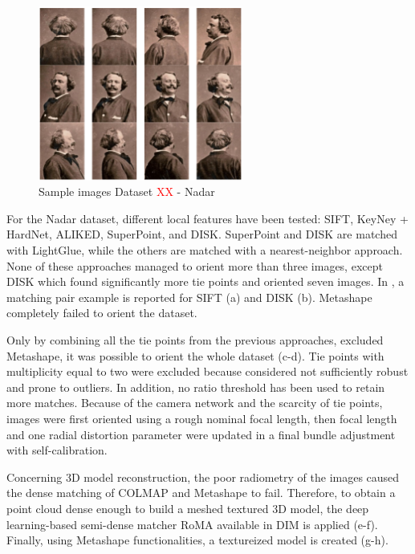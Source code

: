 \begin{figure}
    \centering
    \includegraphics[width=0.6\textwidth]{nadar_images}
    \caption{Sample images Dataset \textcolor{red}{XX} - Nadar}
    \label{fig:5:nadar_images}
\end{figure}

For the Nadar dataset, different local features have been tested: SIFT, KeyNey + HardNet, ALIKED, SuperPoint, and DISK.
SuperPoint and DISK are matched with LightGlue, while the others are matched with a nearest-neighbor approach. 
None of these approaches managed to orient more than three images, except DISK which found significantly more tie points and oriented seven images. 
In , a matching pair example is reported for SIFT (a) and DISK (b).
Metashape completely failed to orient the dataset. 

Only by combining all the tie points from the previous approaches, excluded Metashape, it was possible to orient the whole dataset (c-d). 
Tie points with multiplicity equal to two were excluded because considered not sufficiently robust and prone to outliers. 
In addition, no ratio threshold has been used to retain more matches. 
Because of the camera network and the scarcity of tie points, images were first oriented using a rough nominal focal length, then focal length and one radial distortion parameter were updated in a final bundle adjustment with self-calibration.

Concerning 3D model reconstruction, the poor radiometry of the images caused the dense matching of COLMAP and Metashape to fail. 
Therefore, to obtain a point cloud dense enough to build a meshed textured 3D model, the deep learning-based semi-dense matcher RoMA available in DIM is applied (e-f). 
Finally, using Metashape functionalities, a textureized model is created (g-h).

